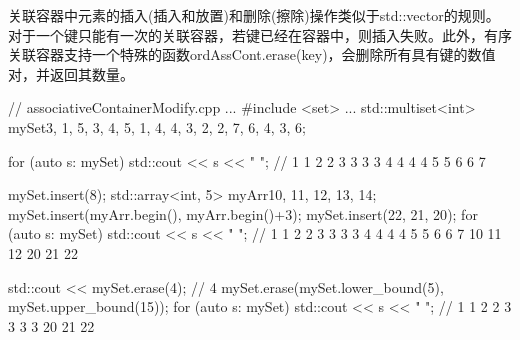 
关联容器中元素的插入(插入和放置)和删除(擦除)操作类似于std::vector的规则。对于一个键只能有一次的关联容器，若键已经在容器中，则插入失败。此外，有序关联容器支持一个特殊的函数ordAssCont.erase(key)，会删除所有具有键的数值对，并返回其数量。


\begin{cpp}
// associativeContainerModify.cpp
...
#include <set>
...
std::multiset<int> mySet{3, 1, 5, 3, 4, 5, 1, 4, 4, 3, 2, 2, 7, 6, 4, 3, 6};

for (auto s: mySet) std::cout << s << " ";
	// 1 1 2 2 3 3 3 3 4 4 4 4 5 5 6 6 7

mySet.insert(8);
std::array<int, 5> myArr{10, 11, 12, 13, 14};
mySet.insert(myArr.begin(), myArr.begin()+3);
mySet.insert({22, 21, 20});
for (auto s: mySet) std::cout << s << " ";
	// 1 1 2 2 3 3 3 3 4 4 4 4 5 5 6 6 7 10 11 12 20 21 22
	
std::cout << mySet.erase(4); // 4
mySet.erase(mySet.lower_bound(5), mySet.upper_bound(15));
for (auto s: mySet) std::cout << s << " ";
	// 1 1 2 2 3 3 3 3 20 21 22
\end{cpp}


